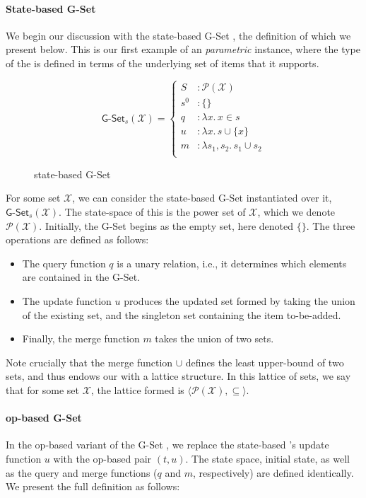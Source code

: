 \paragraph{State-based G-Set}

We begin our discussion with the state-based G-Set \CRDT, the definition of
which we present below. This is our first example of an \emph{parametric} \CRDT
instance, where the type of the \CRDT is defined in terms of the underlying set
of items that it supports.

\begin{figure}[H]
  \centering
  \[
    \textsf{G-Set}_s(\mathcal{X}) = \left\{\begin{aligned}
      S &: \mathcal{P}(\mathcal{X}) \\
      s^0 &: \{ \} \\
      q &: \lambda x.\, x \in s \\
      u &: \lambda x.\, s \cup \{ x \} \\
      m &: \lambda s_1, s_2.\, s_1 \cup s_2 \\
    \end{aligned}\right.
  \]
  \caption{state-based \textsf{G-Set} \CRDT}
\end{figure}

For some set $\mathcal{X}$, we can consider the state-based G-Set \CRDT
instantiated over it, $\textsf{G-Set}_s(\mathcal{X})$. The state-space of this
\CRDT is the power set of $\mathcal{X}$, which we denote
$\mathcal{P}(\mathcal{X})$. Initially, the G-Set begins as the empty set, here
denoted $\{ \}$. The three operations are defined as follows:
\begin{itemize}
  \item The query function $q$ is a unary relation, i.e., it determines which
    elements are contained in the G-Set.
  \item The update function $u$ produces the updated set formed by taking the
    union of the existing set, and the singleton set containing the item
    to-be-added.
  \item Finally, the merge function $m$ takes the union of two sets.
\end{itemize}
Note crucially that the merge function $\cup$ defines the least upper-bound of
two sets, and thus endows our \CRDT with a lattice structure. In this lattice of
sets, we say that for some set $\mathcal{X}$, the lattice formed is $\langle
\mathcal{P}(\mathcal{X}), \subseteq \rangle$.

\paragraph{op-based G-Set}
In the op-based variant of the G-Set \CRDT, we replace the state-based \CRDT's
update function $u$ with the op-based pair $(t,u)$. The state space, initial
state, as well as the query and merge functions ($q$ and $m$, respectively) are
defined identically. We present the full definition as follows:

